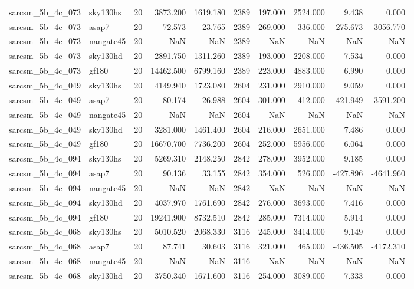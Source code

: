 \begin{longtable}{llrrrrrrrr}
sarcsm\_5b\_4c\_073 & sky130hs & 20 & 3873.200 & 1619.180 & 2389 & 197.000 & 2524.000 & 9.438 & 0.000 \\
sarcsm\_5b\_4c\_073 & asap7 & 20 & 72.573 & 23.765 & 2389 & 269.000 & 336.000 & -275.673 & -3056.770 \\
sarcsm\_5b\_4c\_073 & nangate45 & 20 & NaN & NaN & 2389 & NaN & NaN & NaN & NaN \\
sarcsm\_5b\_4c\_073 & sky130hd & 20 & 2891.750 & 1311.260 & 2389 & 193.000 & 2208.000 & 7.534 & 0.000 \\
sarcsm\_5b\_4c\_073 & gf180 & 20 & 14462.500 & 6799.160 & 2389 & 223.000 & 4883.000 & 6.990 & 0.000 \\
sarcsm\_5b\_4c\_049 & sky130hs & 20 & 4149.940 & 1723.080 & 2604 & 231.000 & 2910.000 & 9.059 & 0.000 \\
sarcsm\_5b\_4c\_049 & asap7 & 20 & 80.174 & 26.988 & 2604 & 301.000 & 412.000 & -421.949 & -3591.200 \\
sarcsm\_5b\_4c\_049 & nangate45 & 20 & NaN & NaN & 2604 & NaN & NaN & NaN & NaN \\
sarcsm\_5b\_4c\_049 & sky130hd & 20 & 3281.000 & 1461.400 & 2604 & 216.000 & 2651.000 & 7.486 & 0.000 \\
sarcsm\_5b\_4c\_049 & gf180 & 20 & 16670.700 & 7736.200 & 2604 & 252.000 & 5956.000 & 6.064 & 0.000 \\
sarcsm\_5b\_4c\_094 & sky130hs & 20 & 5269.310 & 2148.250 & 2842 & 278.000 & 3952.000 & 9.185 & 0.000 \\
sarcsm\_5b\_4c\_094 & asap7 & 20 & 90.136 & 33.155 & 2842 & 354.000 & 526.000 & -427.896 & -4641.960 \\
sarcsm\_5b\_4c\_094 & nangate45 & 20 & NaN & NaN & 2842 & NaN & NaN & NaN & NaN \\
sarcsm\_5b\_4c\_094 & sky130hd & 20 & 4037.970 & 1761.690 & 2842 & 276.000 & 3693.000 & 7.416 & 0.000 \\
sarcsm\_5b\_4c\_094 & gf180 & 20 & 19241.900 & 8732.510 & 2842 & 285.000 & 7314.000 & 5.914 & 0.000 \\
sarcsm\_5b\_4c\_068 & sky130hs & 20 & 5010.520 & 2068.330 & 3116 & 245.000 & 3414.000 & 9.149 & 0.000 \\
sarcsm\_5b\_4c\_068 & asap7 & 20 & 87.741 & 30.603 & 3116 & 321.000 & 465.000 & -436.505 & -4172.310 \\
sarcsm\_5b\_4c\_068 & nangate45 & 20 & NaN & NaN & 3116 & NaN & NaN & NaN & NaN \\
sarcsm\_5b\_4c\_068 & sky130hd & 20 & 3750.340 & 1671.600 & 3116 & 254.000 & 3089.000 & 7.333 & 0.000 \\

\end{longtable}
